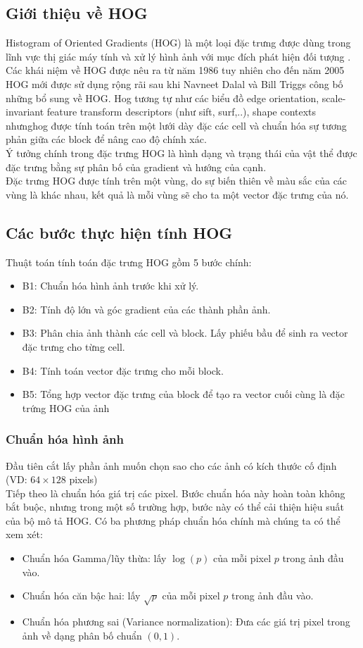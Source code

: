 \documentclass[../report.tex]{subfiles}
\begin{document}
\subsection{Giới thiệu về HOG}
Histogram of Oriented Gradients (HOG) là một loại đặc trưng được dùng 
trong lĩnh vực thị giác máy tính và xử lý hình ảnh 
với mục đích phát hiện đối tượng \cite{tim-hieu-hog}. 
Các khái niệm về HOG được nêu 
ra từ năm 1986 tuy nhiên cho đến năm 2005 HOG mới được sử dụng 
rộng rãi sau khi Navneet Dalal và Bill Triggs công bố những 
bổ sung về HOG. Hog tương tự như các biểu đồ edge 
orientation, scale-invariant feature transform descriptors 
(như sift, surf,..), shape contexts nhưnghog được tính toán 
trên một lưới dày đặc các cell và chuẩn hóa sự tương phản 
giữa các block để nâng cao độ chính xác. \\
Ý tưởng chính trong đặc trưng HOG là hình dạng và trạng thái 
của vật thể được đặc trưng bằng sự phân bố của gradient 
và hướng của cạnh. \\
Đặc trưng HOG được tính trên một vùng, do sự 
biến thiên về màu sắc của các vùng là khác nhau, kết quả là mỗi vùng sẽ cho ta một vector đặc trưng của nó.

\subsection{Các bước thực hiện tính HOG}
Thuật toán tính toán đặc trưng HOG gồm 5 bước chính:
\begin{itemize}
\item B1: Chuẩn hóa hình ảnh trước khi xử lý.
\item B2: Tính độ lớn và góc gradient của các thành phần ảnh.
\item B3: Phân chia ảnh thành các cell và block. 
Lấy phiếu bầu để sinh ra vector đặc trưng cho từng cell.
\item B4: Tính toán vector đặc trưng cho mỗi block.
\item B5: Tổng hợp vector đặc trưng của block để tạo ra 
vector cuối cùng là đặc trứng HOG của ảnh 
\end{itemize}

\subsubsection{Chuẩn hóa hình ảnh}
Đầu tiên cắt lấy phần ảnh muốn chọn sao cho các ảnh có 
kích thước cố định (VD: $64 \times 128$ pixels) \\[3mm]
Tiếp theo là chuẩn hóa giá trị các pixel. 
Bước chuẩn hóa này hoàn toàn 
không bắt buộc, nhưng trong một số trường hợp, 
bước này có thể cải thiện hiệu suất của bộ mô tả HOG. 
Có ba phương pháp chuẩn hóa chính mà chúng ta có thể xem xét:
\begin{itemize}
\item Chuẩn hóa Gamma/lũy thừa: lấy $\log(p)$ của mỗi 
pixel $p$ trong ảnh đầu vào.
\item Chuẩn hóa căn bậc hai: lấy $\sqrt{p}$
của mỗi pixel $p$ trong ảnh đầu vào.
\item Chuẩn hóa phương sai (Variance normalization): Đưa các giá trị 
pixel trong ảnh về dạng phân bố chuẩn $(0,1)$.
\end{itemize}
\end{document}
